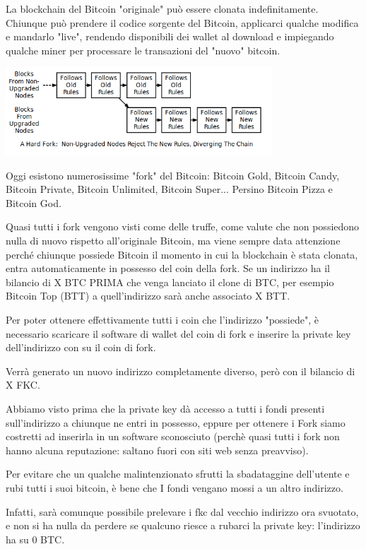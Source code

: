 \documentclass {article}
\begin{document}
La blockchain del Bitcoin "originale" può essere clonata indefinitamente. Chiunque può prendere il codice sorgente del Bitcoin, applicarci qualche modifica e mandarlo "live", rendendo disponibili dei wallet al download e impiegando qualche miner per processare le transazioni del "nuovo" bitcoin.



\includegraphics [width = 10cm] {media/hard_fork.png}



Oggi esistono numerosissime "fork" del Bitcoin: Bitcoin Gold, Bitcoin Candy, Bitcoin Private, Bitcoin Unlimited, Bitcoin Super... Persino Bitcoin Pizza e Bitcoin God.

Quasi tutti i fork vengono visti come delle truffe, come valute che non possiedono nulla di nuovo rispetto all'originale Bitcoin, ma viene sempre data attenzione perché chiunque possiede Bitcoin il momento in cui la blockchain è stata clonata, entra automaticamente in possesso del coin della fork. Se un indirizzo ha il bilancio di X BTC PRIMA che venga lanciato il clone di BTC, per esempio Bitcoin Top (BTT) a quell'indirizzo sarà anche associato X BTT.

Per poter ottenere effettivamente tutti i coin che l'indirizzo "possiede", è necessario scaricare il software di wallet del coin di fork e inserire la private key dell'indirizzo con su il coin di fork.

Verrà generato un nuovo indirizzo completamente diverso, però con il bilancio di X FKC.

Abbiamo visto prima che la private key dà accesso a tutti i fondi presenti sull'indirizzo a chiunque ne entri in possesso, eppure per ottenere i Fork siamo costretti ad inserirla in un software sconosciuto (perchè quasi tutti i fork non hanno alcuna reputazione: saltano fuori con siti web senza preavviso).

Per evitare che un qualche malintenzionato sfrutti la sbadataggine dell'utente e rubi tutti i suoi bitcoin, è bene che I fondi vengano mossi a un altro indirizzo.

Infatti, sarà comunque possibile prelevare i fkc dal vecchio indirizzo ora svuotato, e non si ha nulla da perdere se qualcuno riesce a rubarci la private key: l'indirizzo ha su 0 BTC.
\end{document}
